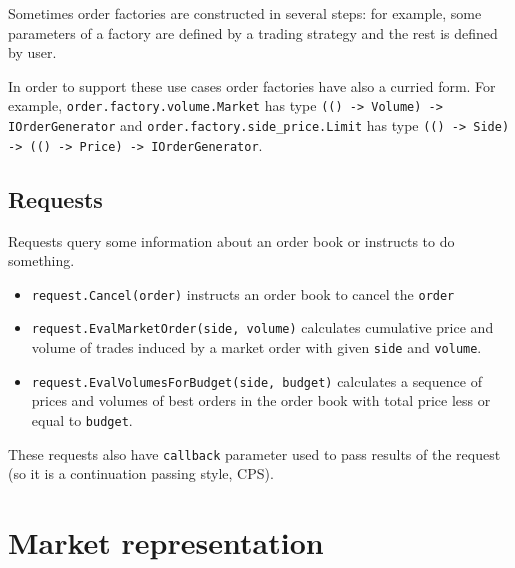 \documentclass[a4paper,11pt]{article}
\begin{document}
Sometimes order factories are constructed in several steps: for example,
some parameters of a factory are defined by a trading strategy and the
rest is defined by user.

In order to support these use cases order factories have also a curried
form. For example, \texttt{order.factory.volume.Market} has type
\texttt{(() -\textgreater{} Volume) -\textgreater{} IOrderGenerator} and
\texttt{order.factory.side\_price.Limit} has type
\texttt{(() -\textgreater{} Side) -\textgreater{} (() -\textgreater{} Price) -\textgreater{} IOrderGenerator}.

\subsection{Requests}\label{requests}

Requests query some information about an order book or instructs to do
something.

\begin{itemize}
\itemsep1pt\parskip0pt
\item
  \texttt{request.Cancel(order)} instructs an order book to cancel the
  \texttt{order}
\item
  \texttt{request.EvalMarketOrder(side, volume)} calculates cumulative
  price and volume of trades induced by a market order with given
  \texttt{side} and \texttt{volume}.
\item
  \texttt{request.EvalVolumesForBudget(side, budget)} calculates a
  sequence of prices and volumes of best orders in the order book with
  total price less or equal to \texttt{budget}.
\end{itemize}

These requests also have \texttt{callback} parameter used to pass
results of the request (so it is a continuation passing style, CPS).


\section{Market representation}\label{market-representation}
\end{document}
